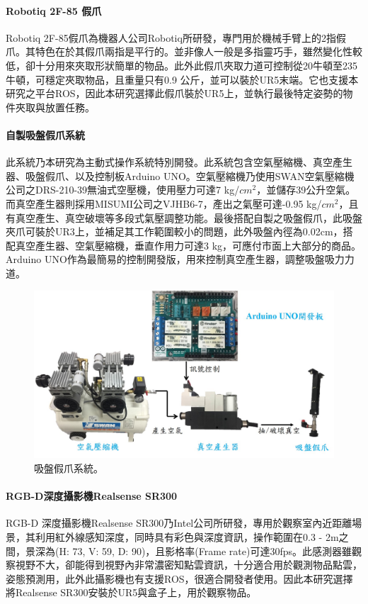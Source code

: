 \paragraph{Robotiq 2F-85 假爪}
Robotiq 2F-85假爪為機器人公司Robotiq所研發，專門用於機械手臂上的2指假爪。其特色在於其假爪兩指是平行的。並非像人一般是多指靈巧手，雖然變化性較低，卻十分用來夾取形狀簡單的物品。此外此假爪夾取力道可控制從20牛頓至235牛頓，可穩定夾取物品，且重量只有0.9 公斤，並可以裝於UR5末端。它也支援本研究之平台ROS，因此本研究選擇此假爪裝於UR5上，並執行最後特定姿勢的物件夾取與放置任務。

\paragraph{自製吸盤假爪系統}
此系統乃本研究為主動式操作系統特別開發。此系統包含空氣壓縮機、真空產生器、吸盤假爪、以及控制板Arduino UNO。空氣壓縮機乃使用SWAN空氣壓縮機公司之DRS-210-39無油式空壓機，使用壓力可達7 kg/$cm^{2}$，並儲存39公升空氣。而真空產生器則採用MISUMI公司之VJHB6-7，產出之氣壓可達-0.95 kg/$cm^{2}$，且有真空產生、真空破壞等多段式氣壓調整功能。最後搭配自製之吸盤假爪，此吸盤夾爪可裝於UR3上，並補足其工作範圍較小的問題，此外吸盤內徑為0.02cm，搭配真空產生器、空氣壓縮機，垂直作用力可達3 kg，可應付市面上大部分的商品。Arduino UNO作為最簡易的控制開發版，用來控制真空產生器，調整吸盤吸力力道。

\begin{figure}[ht]
	\centering
	\includegraphics[height=!, width=1.0\linewidth, keepaspectratio=true]
	{./figures/suction_system.jpg}
  \caption{吸盤假爪系統。}
  \label{figure:suction_gripper}
\end{figure}

\paragraph{RGB-D深度攝影機Realsense SR300}
RGB-D 深度攝影機Realsense SR300乃Intel公司所研發，專用於觀察室內近距離場景，其利用紅外線感知深度，同時具有彩色與深度資訊，操作範圍在0.3 - 2m之間，景深為(H: 73, V: 59, D: 90)，且影格率(Frame rate)可達30fps。此感測器雖觀察視野不大，卻能得到視野內非常濃密知點雲資訊，十分適合用於觀測物品點雲，姿態預測用，此外此攝影機也有支援ROS，很適合開發者使用。因此本研究選擇將Realsense SR300安裝於UR5與盒子上，用於觀察物品。

